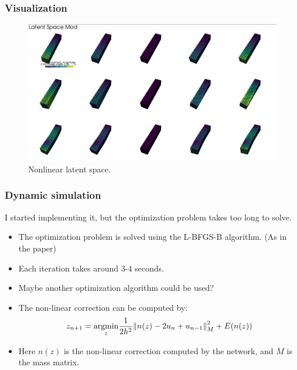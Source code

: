 \documentclass{beamer}
\DeclareMathOperator{\argmin}{argmin}
\begin{document}
\begin{frame}
    \frametitle{Visualization}
    \begin{figure}
        \centering
        \includegraphics[scale=0.15]{Images/image.png}
        \caption{Nonlinear latent space.}
    \end{figure}
\end{frame}

\begin{frame}
    \frametitle{Dynamic simulation}
    I started implementing it, but the optimization problem takes too long to solve.
    \begin{itemize}
        \item The optimization problem is solved using the L-BFGS-B algorithm. (As in the paper)
        \item Each iteration takes around 3-4 seconds.
        \item Maybe another optimization algorithm could be used?
    \end{itemize}
    \begin{itemize}
        \item The non-linear correction can be computed by:
        \[
        z_{n+1} = \underset{z}{\argmin}  \frac{1}{2h^2} \norm{n(z) - 2u_n + u_{n-1}}^2_M + E(n(z))
        \]
        \item Here \(n(z)\) is the non-linear correction computed by the network, and \(M\) is the mass matrix.
    \end{itemize}
\end{frame}
\end{document}
